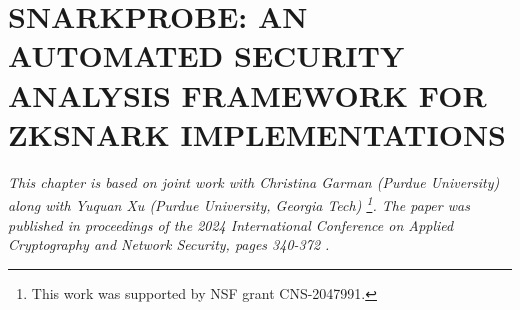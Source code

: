 \chapter{SNARKPROBE: AN AUTOMATED SECURITY ANALYSIS FRAMEWORK FOR ZKSNARK IMPLEMENTATIONS}
\label{ch:snarkprobe}

\textit{This chapter is based on joint work with Christina Garman (Purdue University) along with Yuquan Xu (Purdue University, Georgia Tech) \footnote{This work was supported by NSF grant CNS-2047991.}. The paper was published in proceedings of the 2024 International Conference on Applied Cryptography and Network Security, pages 340-372 \cite{fan2024snarkprobe}.}








